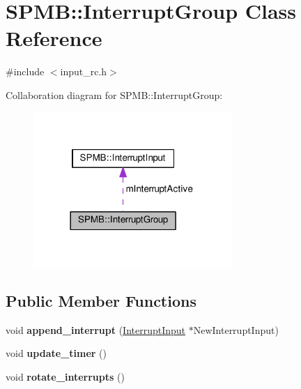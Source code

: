 \hypertarget{classSPMB_1_1InterruptGroup}{}\section{S\+P\+MB\+:\+:Interrupt\+Group Class Reference}
\label{classSPMB_1_1InterruptGroup}


{\ttfamily \#include $<$input\+\_\+rc.\+h$>$}



Collaboration diagram for S\+P\+MB\+:\+:Interrupt\+Group\+:
\nopagebreak
\begin{figure}[H]
\begin{center}
\leavevmode
\includegraphics[width=213pt]{classSPMB_1_1InterruptGroup__coll__graph}
\end{center}
\end{figure}
\subsection*{Public Member Functions}
\begin{DoxyCompactItemize}
\item 
void {\bfseries append\+\_\+interrupt} (\hyperlink{classSPMB_1_1InterruptInput}{Interrupt\+Input} $\ast$New\+Interrupt\+Input)\hypertarget{classSPMB_1_1InterruptGroup_af657eec701e542ca195e2ac8fe817527}{}\label{classSPMB_1_1InterruptGroup_af657eec701e542ca195e2ac8fe817527}

\item 
void {\bfseries update\+\_\+timer} ()\hypertarget{classSPMB_1_1InterruptGroup_a40e413db26817d4381295fbe0cc41f85}{}\label{classSPMB_1_1InterruptGroup_a40e413db26817d4381295fbe0cc41f85}

\item 
void {\bfseries rotate\+\_\+interrupts} ()\hypertarget{classSPMB_1_1InterruptGroup_a0636f92ce6b96c7e3c2c93dd8b8352f9}{}\label{classSPMB_1_1InterruptGroup_a0636f92ce6b96c7e3c2c93dd8b8352f9}

\end{DoxyCompactItemize}
